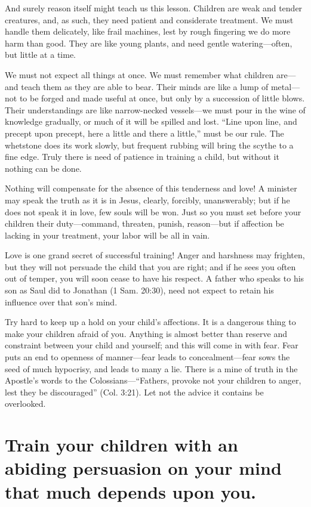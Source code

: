 \documentclass[
]{book}
\begin{document}
And surely reason itself might teach us this lesson. Children are weak and tender creatures, and, as such, they need patient and considerate treatment. We must handle them delicately, like frail machines, lest by rough fingering we do more harm than good. They are like young plants, and need gentle watering---often, but little at a time.

We must not expect all things at once. We must remember what children are---and teach them as they are able to bear. Their minds are like a lump of metal---not to be forged and made useful at once, but only by a succession of little blows. Their understandings are like narrow-necked vessels---we must pour in the wine of knowledge gradually, or much of it will be spilled and lost. ``Line upon line, and precept upon precept, here a little and there a little,'' must be our rule. The whetstone does its work slowly, but frequent rubbing will bring the scythe to a fine edge. Truly there is need of patience in training a child, but without it nothing can be done.

Nothing will compensate for the absence of this tenderness and love! A minister may speak the truth as it is in Jesus, clearly, forcibly, unanswerably; but if he does not speak it in love, few souls will be won. Just so you must set before your children their duty---command, threaten, punish, reason---but if affection be lacking in your treatment, your labor will be all in vain.

Love is one grand secret of successful training! Anger and harshness may frighten, but they will not persuade the child that you are right; and if he sees you often out of temper, you will soon cease to have his respect. A father who speaks to his son as Saul did to Jonathan (1 Sam. 20:30), need not expect to retain his influence over that son's mind.

Try hard to keep up a hold on your child's affections. It is a dangerous thing to make your children afraid of you. Anything is almost better than reserve and constraint between your child and yourself; and this will come in with fear. Fear puts an end to openness of manner---fear leads to concealment---fear sows the seed of much hypocrisy, and leads to many a lie. There is a mine of truth in the Apostle's words to the Colossians---``Fathers, provoke not your children to anger, lest they be discouraged'' (Col. 3:21). Let not the advice it contains be overlooked.

\hypertarget{train-your-children-with-an-abiding-persuasion-on-your-mind-that-much-depends-upon-you.}{%
\chapter{Train your children with an abiding persuasion on your mind that much depends upon you.}\label{train-your-children-with-an-abiding-persuasion-on-your-mind-that-much-depends-upon-you.}}
\end{document}
